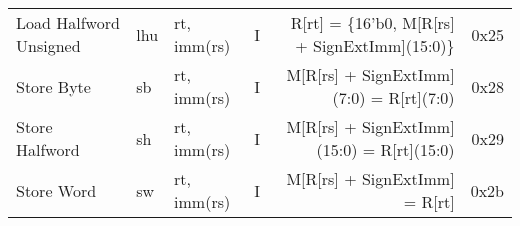 \begin{tabularx}{\textwidth}{lMAcDr}
    Load Halfword Unsigned                                                          & lhu    & rt, imm(rs)   & I &
    R[rt] = \{16'b0, M[R[rs] + SignExtImm](15:0)\} \footnotemark[2]                 & 0x25                         \\
    Store Byte                                                                      & sb     & rt, imm(rs)   & I &
    M[R[rs] + SignExtImm](7:0) = R[rt](7:0)        \footnotemark[2]                 & 0x28                         \\
    Store Halfword                                                                  & sh     & rt, imm(rs)   & I &
    M[R[rs] + SignExtImm](15:0) = R[rt](15:0)      \footnotemark[2]                 & 0x29                         \\
    Store Word                                                                      & sw     & rt, imm(rs)   & I &
    M[R[rs] + SignExtImm] = R[rt]                  \footnotemark[2]                 & 0x2b                         \\
    \bottomrule
\end{tabularx}

\begin{minipage}[t]{\linewidth-4em}
    \begin{multicols}{2}
        \small
            \\
         \\
            \\
         \\
            \\
    \end{multicols}
\end{minipage}
